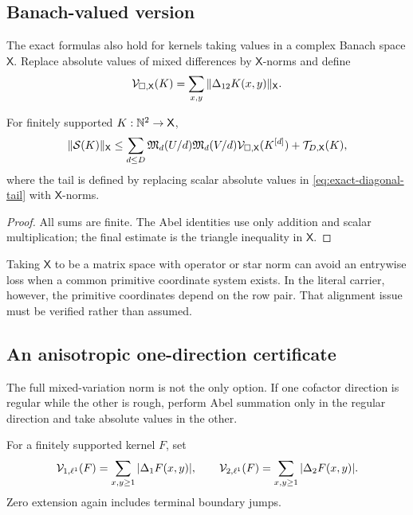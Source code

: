 \subsection{Banach-valued version}

The exact formulas also hold for kernels taking values in a complex Banach
space \(\mathsf X\).  Replace absolute values of mixed differences by
\(\mathsf X\)-norms and define
\[
 \mathcal V_{\square,\mathsf X}(K)
 =
 \sum_{x,y}\|\Delta_{12}K(x,y)\|_{\mathsf X}.
\]

\begin{corollary}
\label{cor:banach-valued}
For finitely supported \(K:\mathbb N^2\to\mathsf X\),
\[
 \|\mathcal S(K)\|_{\mathsf X}
 \le
 \sum_{d\le D}
 \mathfrak M_d(U/d)\mathfrak M_d(V/d)
 \mathcal V_{\square,\mathsf X}(K^{[d]})
 +\mathcal T_{D,\mathsf X}(K),
\]
where the tail is defined by replacing scalar absolute values in
\eqref{eq:exact-diagonal-tail} with \(\mathsf X\)-norms.
\end{corollary}

\begin{proof}
All sums are finite.  The Abel identities use only addition and scalar
multiplication; the final estimate is the triangle inequality in
\(\mathsf X\).
\end{proof}

\begin{remark}
Taking \(\mathsf X\) to be a matrix space with operator or star norm can
avoid an entrywise loss when a common primitive coordinate system exists.
In the literal carrier, however, the primitive coordinates depend on the
row pair.  That alignment issue must be verified rather than assumed.
\end{remark}

\subsection{An anisotropic one-direction certificate}

The full mixed-variation norm is not the only option.  If one cofactor
direction is regular while the other is rough, perform Abel summation only
in the regular direction and take absolute values in the other.

\begin{definition}
For a finitely supported kernel \(F\), set
\[
 \mathcal V_{1,\ell^1}(F)
 =
 \sum_{x,y\ge1}|\Delta_1F(x,y)|,
 \qquad
 \mathcal V_{2,\ell^1}(F)
 =
 \sum_{x,y\ge1}|\Delta_2F(x,y)|.
\]
Zero extension again includes terminal boundary jumps.
\end{definition}

